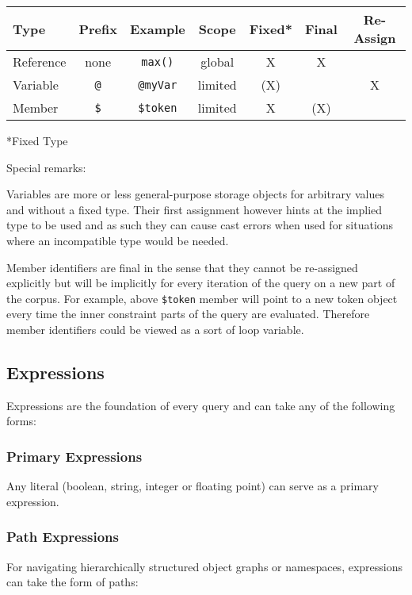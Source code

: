 \documentclass[11pt]{article}
\begin{document}
\noindent\begin{tabular}{|l|c|c|c|c|c|c|}
	\hline 
Type	& Prefix & Example & Scope & Fixed* & Final & Re-Assign \\ 
	\hline 
Reference	& none & \texttt{max()} & global & X & X &  \\ 
	\hline 
Variable	& \texttt{@} & \texttt{@myVar} & limited & (X) &  & X \\ 
	\hline 
Member	& \texttt{\$} & \texttt{\$token} & limited & X & (X) &  \\ 
	\hline 
\end{tabular} 

*Fixed Type

Special remarks:

Variables are more or less general-purpose storage objects for arbitrary values and without a fixed type. Their first assignment however hints at the implied type to be used and as such they can cause cast errors when used for situations where an incompatible type would be needed.

Member identifiers are final in the sense that they cannot be re-assigned explicitly but will be implicitly for every iteration of the query on a new part of the corpus. For example, above \texttt{\$token} member will point to a new token object every time the inner constraint parts of the query are evaluated. Therefore member identifiers could be viewed as a sort of loop variable. 

\subsection{Expressions}
\label{sec:expressions}

Expressions are the foundation of every query and can take any of the following forms:

\subsubsection{Primary Expressions}
\label{sec:primary-expressions}

Any literal (boolean, string, integer or floating point) can serve as a primary expression.

\subsubsection{Path Expressions}
\label{sec:path-expressions}

For navigating hierarchically structured object graphs or namespaces, expressions can take the form of paths:
\end{document}
